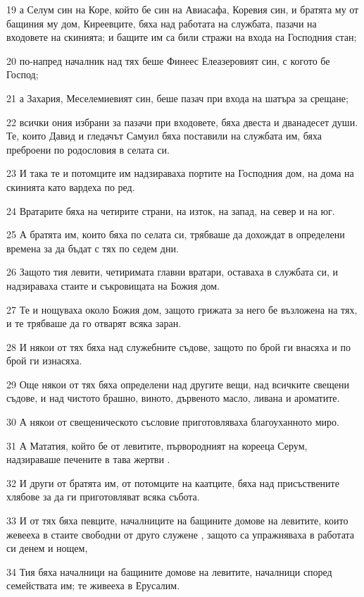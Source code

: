 \par 19 а Селум син на Коре, който бе син на Авиасафа, Коревия син, и братята му от бащиния му дом, Киреевците, бяха над работата на службата, пазачи на входовете на скинията; и бащите им са били стражи на входа на Господния стан;
\par 20 по-напред началник над тях беше Финеес Елеазеровият син, с когото бе Господ;
\par 21 а Захария, Меселемиевият син, беше пазач при входа на шатъра за срещане;
\par 22 всички ония избрани за пазачи при входовете, бяха двеста и дванадесет души. Те, които Давид и гледачът Самуил бяха поставили на службата им, бяха преброени по родословия в селата си.
\par 23 И така те и потомците им надзираваха портите на Господния дом, на дома на скинията като вардеха по ред.
\par 24 Вратарите бяха на четирите страни, на изток, на запад, на север и на юг.
\par 25 А братята им, които бяха по селата си, трябваше да дохождат в определени времена за да бъдат с тях по седем дни.
\par 26 Защото тия левити, четиримата главни вратари, оставаха в службата си, и надзираваха стаите и съкровищата на Божия дом.
\par 27 Те и нощуваха около Божия дом, защото грижата за него бе възложена на тях, и те трябваше да го отварят всяка заран.
\par 28 И някои от тях бяха над служебните съдове, защото по брой ги внасяха и по брой ги изнасяха.
\par 29 Още някои от тях бяха определени над другите вещи, над всичките свещени съдове, и над чистото брашно, виното, дървеното масло, ливана и ароматите.
\par 30 А някои от свещеническото съсловие приготовляваха благоуханното миро.
\par 31 А Мататия, който бе от левитите, първородният на корееца Серум, надзираваше печените в тава жертви .
\par 32 И други от братята им, от потомците на каатците, бяха над присъствените хлябове за да ги приготовляват всяка събота.
\par 33 И от тях бяха певците, началниците на бащините домове на левитите, които жевееха в стаите свободни от друго служене , защото са упражняваха в работата си денем и нощем,
\par 34 Тия бяха началници на бащините домове на левитите, началници според семействата им; те живееха в Ерусалим.
